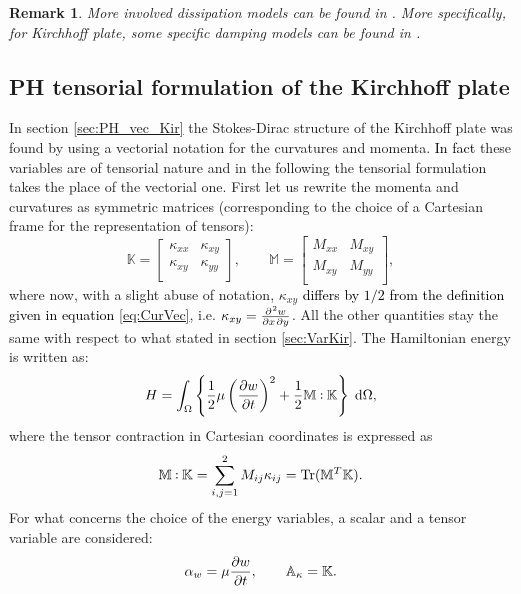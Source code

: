 \documentclass[11pt]{article}
\DeclareMathOperator{\Tr}{Tr}
\newtheorem{remark}{Remark}
\newcommand{\revOne}[1]{\textcolor{black}{#1}}
\def\onedot{$\mathsurround0pt\ldotp$}
\def\cddot{%
	\mathbin{\vcenter{\baselineskip.67ex
			\hbox{\onedot}\hbox{\onedot}}%
}}
\begin{document}
	\begin{remark}
		More involved dissipation models can be found in \cite{DissDenis}. More specifically, for Kirchhoff plate, some specific damping models can be found in \cite{LambourgJASA}.
	\end{remark}	
	
	
	\subsection{PH tensorial formulation of the Kirchhoff plate}
	\label{sec:PH_ten_Kir}
	
	In section \ref{sec:PH_vec_Kir} the Stokes-Dirac structure of the Kirchhoff plate was found by using a vectorial notation for the curvatures and momenta. \revOne{In fact} these variables are of tensorial nature and in the following the tensorial formulation takes the place of the vectorial one. First let us rewrite the momenta and curvatures as symmetric matrices (corresponding to the choice of a Cartesian frame for the representation of tensors):
	\begin{equation}
	\mathbb{K} = 
	\begin{bmatrix}
	\kappa_{xx} &  \kappa_{xy}\\
	\kappa_{xy} & \kappa_{yy} \\
	\end{bmatrix}, \qquad
	\mathbb{M} =
	\begin{bmatrix}
	M_{xx} & M_{xy} \\
	M_{xy} & M_{yy} \\
	\end{bmatrix},
	\end{equation}
	where now, with a slight abuse of notation, $\kappa_{xy}$ \revOne{differs by $1/2$ from the definition given in equation \eqref{eq:CurVec}}, i.e. $\kappa_{xy} =\diffp{w}{x,y}$. All the other quantities stay the same with respect to what stated in section \ref{sec:VarKir}. The Hamiltonian energy is written as:
	\begin{equation}
	\label{eq:H_Kir_Ten}
	H = \int_{\Omega} \left\{ \frac{1}{2} \mu \left(\diffp{w}{t} \right)^2 + \frac{1}{2} \mathbb{M} \cddot \mathbb{K}  \right\}  \d{\Omega} ,
	\end{equation}
	where the tensor contraction in Cartesian coordinates is expressed as
	\[\mathbb{M} \cddot \mathbb{K} = \sum_{i,j = 1}^{2} M_{ij} \kappa_{ij} = \Tr(\mathbb{M}^T \mathbb{K}). \]
	For what concerns the choice of the energy variables, a scalar and a tensor variable are considered:
	\begin{equation}
	\alpha_w = \mu \diffp{w}{t}, \qquad \mathbb{A}_{\kappa} = \mathbb{K}.	\end{equation}
\end{document}
